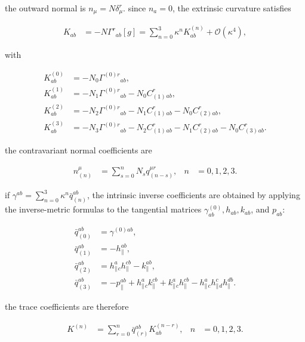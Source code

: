 the outward normal is $\displaystyle{n_{\mu}=N\delta ^r_{\mu}}$. since $\displaystyle{n_{a}=0}$, the extrinsic curvature satisfies

\begin{align}
K_{ab} & =-N\Gamma ^r{}_{ab}[g]=\sum _{n=0}^{3}\kappa ^nK_{ab}^{(n)}+\mathcal{O}(\kappa ^4),
\end{align}

with

\[\begin{aligned}
K_{ab}^{(0)} & =-N_{0}\Gamma ^{(0)r}{}_{ab}, \\
K_{ab}^{(1)} & =-N_{1}\Gamma ^{(0)r}{}_{ab}-N_{0}C_{(1)}^{r}{}_{ab}, \\
K_{ab}^{(2)} & =-N_{2}\Gamma ^{(0)r}{}_{ab}-N_{1}C_{(1)}^{r}{}_{ab}-N_{0}C_{(2)}^{r}{}_{ab}, \\
K_{ab}^{(3)} & =-N_{3}\Gamma ^{(0)r}{}_{ab}-N_{2}C_{(1)}^{r}{}_{ab}-N_{1}C_{(2)}^{r}{}_{ab}-N_{0}C_{(3)}^{r}{}_{ab}.
\end{aligned}\]

the contravariant normal coefficients are

\begin{align}
n_{(n)}^{\mu} & =\sum _{s=0}^{n}N_{s}q_{(n-s)}^{\mu r}, & n&=0,1,2,3.
\end{align}

if $\displaystyle{\gamma ^{ab}=\sum _{n=0}^{3}\kappa ^n\bar q_{(n)}^{ab}}$, the intrinsic inverse coefficients are obtained by applying the inverse-metric formulas to the tangential matrices $\displaystyle{\gamma _{ab}^{(0)},h_{ab},k_{ab}}$, and $\displaystyle{p_{ab}}$:

\[\begin{aligned}
\bar q_{(0)}^{ab} & =\gamma ^{(0)ab}, \\
\bar q_{(1)}^{ab} & =-h_{\parallel}^{ab}, \\
\bar q_{(2)}^{ab} & =h_{\parallel}^{a}{}_{c}h_{\parallel}^{cb}-k_{\parallel}^{ab}, \\
\bar q_{(3)}^{ab} & =-p_{\parallel}^{ab}+h_{\parallel}^{a}{}_{c}k_{\parallel}^{cb}+k_{\parallel}^{a}{}_{c}h_{\parallel}^{cb}-h_{\parallel}^{a}{}_{c}h_{\parallel}^{c}{}_{d}h_{\parallel}^{db}.
\end{aligned}\]

the trace coefficients are therefore

\begin{align}
K^{(n)} & =\sum _{r=0}^{n}\bar q_{(r)}^{ab}K_{ab}^{(n-r)}, & n&=0,1,2,3.
\end{align}

